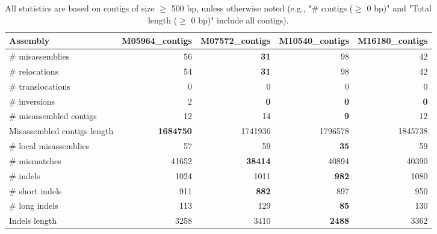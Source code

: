 \documentclass[12pt,a4paper]{article}
\begin{document}
\begin{table}[ht]
\begin{center}
\caption{All statistics are based on contigs of size $\geq$ 500 bp, unless otherwise noted (e.g., "\# contigs ($\geq$ 0 bp)" and "Total length ($\geq$ 0 bp)" include all contigs).}
\begin{tabular}{|l*{4}{|r}|}
\hline
Assembly & M05964\_contigs & M07572\_contigs & M10540\_contigs & M16180\_contigs \\ \hline
\# misassemblies & 56 & {\bf 31} & 98 & 42 \\ \hline
\hspace{5mm}\# relocations & 54 & {\bf 31} & 98 & 42 \\ \hline
\hspace{5mm}\# translocations & 0 & 0 & 0 & 0 \\ \hline
\hspace{5mm}\# inversions & 2 & {\bf 0} & {\bf 0} & {\bf 0} \\ \hline
\# misassembled contigs & 12 & 14 & {\bf 9} & 12 \\ \hline
Misassembled contigs length & {\bf 1684750} & 1741936 & 1796578 & 1845738 \\ \hline
\# local misassemblies & 57 & 59 & {\bf 35} & 59 \\ \hline
\# mismatches & 41652 & {\bf 38414} & 40894 & 40390 \\ \hline
\# indels & 1024 & 1011 & {\bf 982} & 1080 \\ \hline
\hspace{5mm}\# short indels & 911 & {\bf 882} & 897 & 950 \\ \hline
\hspace{5mm}\# long indels & 113 & 129 & {\bf 85} & 130 \\ \hline
Indels length & 3258 & 3410 & {\bf 2488} & 3362 \\ \hline
\end{tabular}
\end{center}
\end{table}
\end{document}
